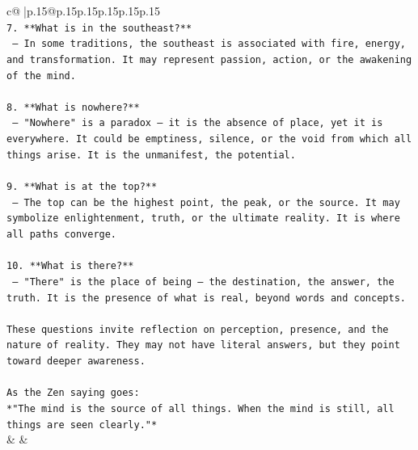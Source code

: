 \documentclass{article}
\begin{document}
{\begin{supertabular}{c@{$\;$}|p{.15\linewidth}@{}p{.15\linewidth}p{.15\linewidth}p{.15\linewidth}p{.15\linewidth}p{.15\linewidth}}
{{{\\ 
\texttt{7. **What is in the southeast?**  } \\
\texttt{   — In some traditions, the southeast is associated with fire, energy, and transformation. It may represent passion, action, or the awakening of the mind.} \\
\\ 
\texttt{8. **What is nowhere?**  } \\
\texttt{   — "Nowhere" is a paradox — it is the absence of place, yet it is everywhere. It could be emptiness, silence, or the void from which all things arise. It is the unmanifest, the potential.} \\
\\ 
\texttt{9. **What is at the top?**  } \\
\texttt{   — The top can be the highest point, the peak, or the source. It may symbolize enlightenment, truth, or the ultimate reality. It is where all paths converge.} \\
\\ 
\texttt{10. **What is there?**  } \\
\texttt{   — "There" is the place of being — the destination, the answer, the truth. It is the presence of what is real, beyond words and concepts.} \\
\\ 
\texttt{These questions invite reflection on perception, presence, and the nature of reality. They may not have literal answers, but they point toward deeper awareness.  } \\
\\ 
\texttt{As the Zen saying goes:  } \\
\texttt{*"The mind is the source of all things. When the mind is still, all things are seen clearly."*} \\
            }
        }
    }
    & & \\ \\


\end{supertabular}}
\end{document}
